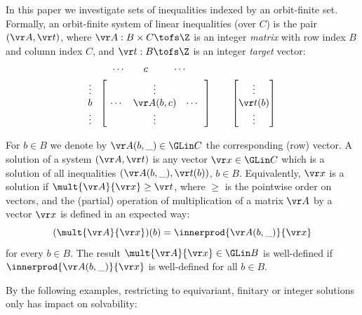 In this paper we investigate sets of inequalities indexed by an orbit-finite set.
Formally, an orbit-finite system of linear inequalities (over $C$)
is the pair $(\vr A, \vr t)$, where $\vr A : B \times C \tofs \Z$ is an integer \emph{matrix} 
with row index $B$ and column index $C$, and $\vr t : B \tofs \Z$ is an integer
\emph{target} vector:
%
\begin{align*}
& \quad\ \ \ \,  \begin{matrix} \ \cdots \quad &  c  & \quad \ \  \cdots\ \end{matrix} \\
& \begin{matrix} \vdots \\ b \\ \vdots \end{matrix} \ \ 
\begin{bmatrix}
\  & \vdots & \ \\
\ \cdots & \vr A(b,c) & \cdots\ \  \\
      & \vdots & \  
\end{bmatrix}
\qquad
\begin{bmatrix}
\vdots  \\
\vr t(b)\\
\vdots   
\end{bmatrix}
\end{align*}
%

\noindent
For $b\in B$ we denote by $\vr A(b, \_) \in \GLin C$ the corresponding (row) vector.
A solution of a system $(\vr A, \vr t)$ is any vector $\vr x\in\GLin C$ which is a solution of all inequalities 
$(\vr A(b, \_), \vr t(b))$, $b\in B$.
%
Equivalently, $\vr x$ is a solution if $\mult{\vr A}{\vr x} \geq \vr t$, where $\geq$ is the pointwise order on vectors,
and the (partial) operation of multiplication of a matrix $\vr A$ by a vector $\vr x$ is defined in an expected way:
\[
(\mult {\vr A}{\vr x})(b) = \innerprod {\vr A(b, \_)} {\vr x}
\]
for every $b\in B$.
The result $\mult {\vr A} {\vr x} \in \GLin B$ is well-defined if $\innerprod {\vr A(b, \_)}{\vr x}$ is well-defined for all $b\in B$.


By the following examples, restricting to equivariant, finitary or integer solutions only
has impact on solvability:

